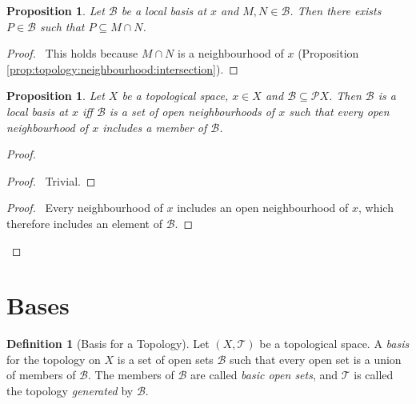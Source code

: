 \documentclass{report}
\let\qed\relax
\newtheorem{prop}[lm]{Proposition}
\theoremstyle{definition}
\newtheorem{df}[lm]{Definition}
\begin{document}
  \begin{prop}
    Let $\mathcal{B}$ be a local basis at $x$ and $M, N \in \mathcal{B}$. Then
    there exists $P \in \mathcal{B}$ such that $P \subseteq M \cap N$.
  \end{prop}

  \begin{proof}
    \pf\ This holds because $M \cap N$ is a neighbourhood of $x$ (Proposition
    \ref{prop:topology:neighbourhood:intersection}). \qed
  \end{proof}

  \begin{prop}
    \label{prop:topology:local_basis:characterisation}
    Let $X$ be a topological space, $x \in X$ and $\mathcal{B} \subseteq
    \mathcal{P} X$. Then $\mathcal{B}$ is a local basis at $x$ iff
    $\mathcal{B}$ is a set of open neighbourhoods of $x$ such that every open
    neighbourhood of $x$ includes a member of $\mathcal{B}$.
  \end{prop}

  \begin{proof}
    \pf
    \begin{proof}
      \pf\ Trivial.
    \end{proof}
    \begin{proof}
      \pf\ Every neighbourhood of $x$ includes an open neighbourhood of $x$,
      which therefore includes an element of $\mathcal{B}$.
    \end{proof}
    \qed
  \end{proof}

  \section{Bases}

  \begin{df}[Basis for a Topology]
    Let $(X, \mathcal{T})$ be a topological space. A \emph{basis} for the
    topology on $X$ is a
    set of open sets $\mathcal{B}$ such that every open set is a union of
    members of $\mathcal{B}$. The members of $\mathcal{B}$ are called
    \emph{basic open sets}, and $\mathcal{T}$ is called the topology
    \emph{generated} by $\mathcal{B}$.
  \end{df}
\end{document}
